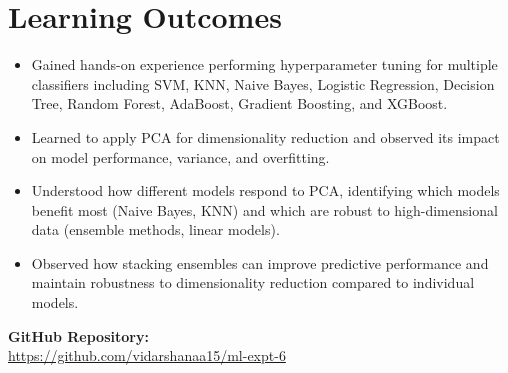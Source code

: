 \documentclass[11pt]{article}
\begin{document}
\vspace{1cm}
\section{Learning Outcomes}
\begin{itemize}
    \item Gained hands-on experience performing hyperparameter tuning for multiple classifiers including SVM, KNN, Naive Bayes, Logistic Regression, Decision Tree, Random Forest, AdaBoost, Gradient Boosting, and XGBoost.
    \item Learned to apply PCA for dimensionality reduction and observed its impact on model performance, variance, and overfitting.
    \item Understood how different models respond to PCA, identifying which models benefit most (Naive Bayes, KNN) and which are robust to high-dimensional data (ensemble methods, linear models).
    \item Observed how stacking ensembles can improve predictive performance and maintain robustness to dimensionality reduction compared to individual models.
\end{itemize}


\vspace{1cm}
\noindent
\textbf{GitHub Repository:} \\
\href{https://github.com/vidarshanaa15/ml-expt-6}{https://github.com/vidarshanaa15/ml-expt-6}
    
\end{document}
